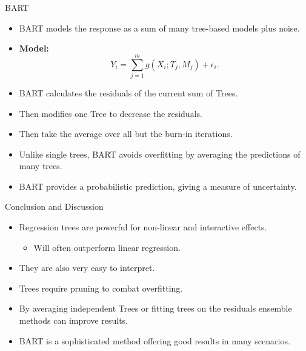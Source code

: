 \documentclass[10pt]{beamer}
\begin{document}
\begin{frame}{BART}
    \begin{itemize}
        \item BART models the response as a sum of many tree-based models plus noise.
        \item \textbf{Model:}
              \begin{equation}
                  Y_i = \sum_{j=1}^{m} g(X_i; T_j, M_j) + \epsilon_i.
              \end{equation}
        \item BART calculates the residuals of the current sum of Trees.
        \item Then modifies one Tree to decrease the residuals.
        \item Then take the average over all but the burn-in iterations.
        \item Unlike single trees, BART avoids overfitting by averaging the predictions of many trees.
        \item BART provides a probabilistic prediction, giving a measure of uncertainty.
    \end{itemize}
\end{frame}


\begin{frame}{Conclusion and Discussion}
    \begin{itemize}
        \item Regression trees are powerful for non-linear and interactive effects.
              \begin{itemize}
                  \item Will often outperform linear regression.
              \end{itemize}
        \item They are also very easy to interpret.
        \item Trees require pruning to combat overfitting.
        \item By averaging independent Trees or fitting trees on the residuals ensemble methods can improve results.
        \item BART is a sophisticated method offering good results in many scenarios.
    \end{itemize}
\end{frame}
\end{document}
